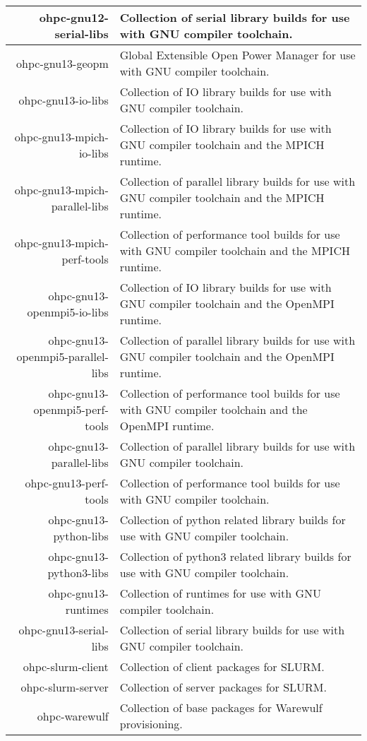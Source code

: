 \begin{tabularx}{\textwidth}{r|X}
\hline
ohpc-gnu12-serial-libs & Collection of serial library builds for use with GNU compiler toolchain. \\
\hline
ohpc-gnu13-geopm & Global Extensible Open Power Manager for use with GNU compiler toolchain. \\
\hline
ohpc-gnu13-io-libs & Collection of IO library builds for use with GNU compiler toolchain. \\
\hline
ohpc-gnu13-mpich-io-libs & Collection of IO library builds for use with GNU compiler toolchain and the MPICH runtime. \\
\hline
ohpc-gnu13-mpich-parallel-libs & Collection of parallel library builds for use with GNU compiler toolchain and the MPICH runtime. \\
\hline
ohpc-gnu13-mpich-perf-tools & Collection of performance tool builds for use with GNU compiler toolchain and the MPICH runtime. \\
\hline
ohpc-gnu13-openmpi5-io-libs & Collection of IO library builds for use with GNU compiler toolchain and the OpenMPI runtime. \\
\hline
ohpc-gnu13-openmpi5-parallel-libs & Collection of parallel library builds for use with GNU compiler toolchain and the OpenMPI runtime. \\
\hline
ohpc-gnu13-openmpi5-perf-tools & Collection of performance tool builds for use with GNU compiler toolchain and the OpenMPI runtime. \\
\hline
ohpc-gnu13-parallel-libs & Collection of parallel library builds for use with GNU compiler toolchain. \\
\hline
ohpc-gnu13-perf-tools & Collection of performance tool builds for use with GNU compiler toolchain. \\
\hline
ohpc-gnu13-python-libs & Collection of python related library builds for use with GNU compiler toolchain. \\
\hline
ohpc-gnu13-python3-libs & Collection of python3 related library builds for use with GNU compiler toolchain. \\
\hline
ohpc-gnu13-runtimes & Collection of runtimes for use with GNU compiler toolchain. \\
\hline
ohpc-gnu13-serial-libs & Collection of serial library builds for use with GNU compiler toolchain. \\
\hline
ohpc-slurm-client & Collection of client packages for SLURM. \\
\hline
ohpc-slurm-server & Collection of server packages for SLURM. \\
\hline
ohpc-warewulf & Collection of base packages for Warewulf provisioning. \\
\hline
\bottomrule
\end{tabularx}
